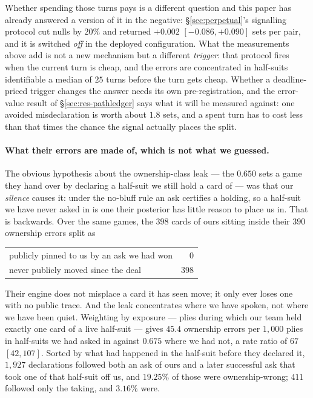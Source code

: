 \documentclass[11pt,a4paper]{article}
\begin{document}
Whether spending those turns pays is a different question and this paper has
already answered a version of it in the negative: \S\ref{sec:perpetual}'s
signalling protocol cut nulls by $20\%$ and returned $+0.002$ $[-0.086,
+0.090]$ sets per pair, and it is switched \emph{off} in the deployed
configuration. What the measurements above add is not a new mechanism but a
different \emph{trigger}: that protocol fires when the current turn is cheap,
and the errors are concentrated in half-suits identifiable a median of $25$
turns before the turn gets cheap. Whether a deadline-priced trigger changes
the answer needs its own pre-registration, and the error-value result of
\S\ref{sec:res-pathledger} says what it will be measured against: one avoided
misdeclaration is worth about $1.8$ sets, and a spent turn has to cost less
than that times the chance the signal actually places the split.

\paragraph{What their errors are made of, which is not what we guessed.} The
obvious hypothesis about the ownership-class leak --- the $0.650$ sets a game
they hand over by declaring a half-suit we still hold a card of --- was that
our \emph{silence} causes it: under the no-bluff rule an ask certifies a
holding, so a half-suit we have never asked in is one their posterior has
little reason to place us in. That is backwards. Over the same games, the $398$
cards of ours sitting inside their $390$ ownership errors split as

\begin{center}
\small
\begin{tabular}{lr}
\toprule
publicly pinned to us by an ask we had won & $0$ \\
never publicly moved since the deal & $398$ \\
\bottomrule
\end{tabular}
\end{center}

\noindent Their engine does not misplace a card it has seen move; it only ever
loses one with no public trace. And the leak concentrates where we have
spoken, not where we have been quiet. Weighting by exposure --- plies during
which our team held exactly one card of a live half-suit --- gives $45.4$
ownership errors per $1{,}000$ plies in half-suits we had asked in against
$0.675$ where we had not, a rate ratio of $67$ $[42, 107]$. Sorted by what had
happened in the half-suit before they declared it, $1{,}927$ declarations
followed both an ask of ours and a later successful ask that took one of that
half-suit off us, and $19.25\%$ of those were ownership-wrong; $411$ followed
only the taking, and $3.16\%$ were.
\end{document}
